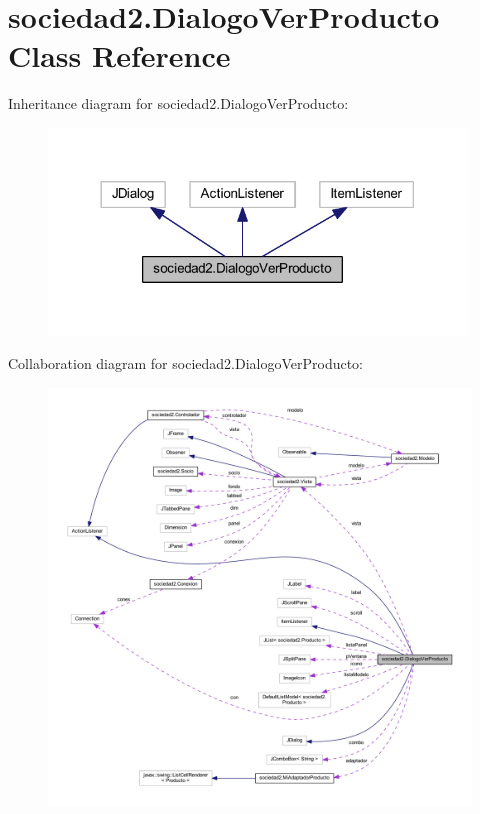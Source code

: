 \hypertarget{classsociedad2_1_1_dialogo_ver_producto}{}\section{sociedad2.\+Dialogo\+Ver\+Producto Class Reference}
\label{classsociedad2_1_1_dialogo_ver_producto}


Inheritance diagram for sociedad2.\+Dialogo\+Ver\+Producto\+:
\nopagebreak
\begin{figure}[H]
\begin{center}
\leavevmode
\includegraphics[width=314pt]{classsociedad2_1_1_dialogo_ver_producto__inherit__graph}
\end{center}
\end{figure}


Collaboration diagram for sociedad2.\+Dialogo\+Ver\+Producto\+:
\nopagebreak
\begin{figure}[H]
\begin{center}
\leavevmode
\includegraphics[width=350pt]{classsociedad2_1_1_dialogo_ver_producto__coll__graph}
\end{center}
\end{figure}
